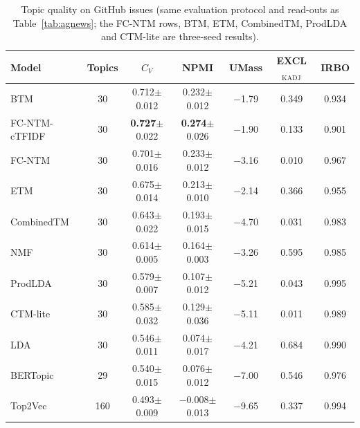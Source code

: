 \documentclass[11pt]{article}
\newcommand{\fcntm}{FC-NTM}
\begin{document}
\begin{table}[t]
\centering
\caption{Topic quality on GitHub issues (same evaluation protocol and read-outs as Table~\ref{tab:agnews}; the FC-NTM rows, BTM, ETM, CombinedTM, ProdLDA and CTM-lite are three-seed results).}
\label{tab:github}
\small
\begin{tabular}{lcccccc}
\toprule
Model & Topics & $C_V$ & NPMI & UMass & EXCL$_{\mathrm{KADJ}}$ & IRBO \\
\midrule
BTM & 30 & 0.712$\pm$0.012 & 0.232$\pm$0.012 & $-$1.79 & 0.349 & 0.934 \\
\fcntm{}-cTFIDF & 30 & \textbf{0.727}$\pm$0.022 & \textbf{0.274}$\pm$0.026 & $-$1.90 & 0.133 & 0.901 \\
\fcntm{} & 30 & 0.701$\pm$0.016 & 0.233$\pm$0.012 & $-$3.16 & 0.010 & 0.967 \\
ETM & 30 & 0.675$\pm$0.014 & 0.213$\pm$0.010 & $-$2.14 & 0.366 & 0.955 \\
CombinedTM & 30 & 0.643$\pm$0.022 & 0.193$\pm$0.015 & $-$4.70 & 0.031 & 0.983 \\
NMF & 30 & 0.614$\pm$0.005 & 0.164$\pm$0.003 & $-$3.26 & 0.595 & 0.985 \\
ProdLDA & 30 & 0.579$\pm$0.007 & 0.107$\pm$0.012 & $-$5.21 & 0.043 & 0.995 \\
CTM-lite & 30 & 0.585$\pm$0.032 & 0.129$\pm$0.036 & $-$5.11 & 0.011 & 0.989 \\
LDA & 30 & 0.546$\pm$0.011 & 0.074$\pm$0.017 & $-$4.21 & 0.684 & 0.990 \\
BERTopic & 29 & 0.540$\pm$0.015 & 0.076$\pm$0.012 & $-$7.00 & 0.546 & 0.976 \\
Top2Vec & 160 & 0.493$\pm$0.009 & $-$0.008$\pm$0.013 & $-$9.65 & 0.337 & 0.994 \\
\bottomrule
\end{tabular}
\end{table}
\end{document}
